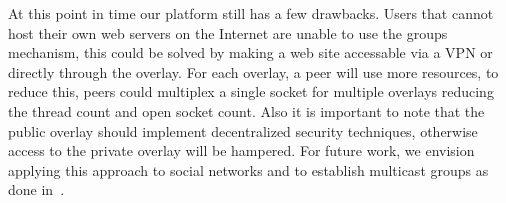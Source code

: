 \documentclass[conference]{IEEEtran}
\begin{document}
At this point in time our platform still has a few drawbacks.  Users that
cannot host their own web servers on the Internet are unable to use the groups
mechanism, this could be solved by making a web site accessable via a VPN or
directly through the overlay.  For each overlay, a peer will use more
resources, to reduce this, peers could multiplex a single socket for multiple
overlays reducing the thread count and open socket count.  Also it is important
to note that the public overlay should implement decentralized security
techniques, otherwise access to the private overlay will be hampered.  For
future work, we envision applying this approach to social networks and to
establish multicast groups as done in~\cite{can}.



\suppressfloats
\end{document}
